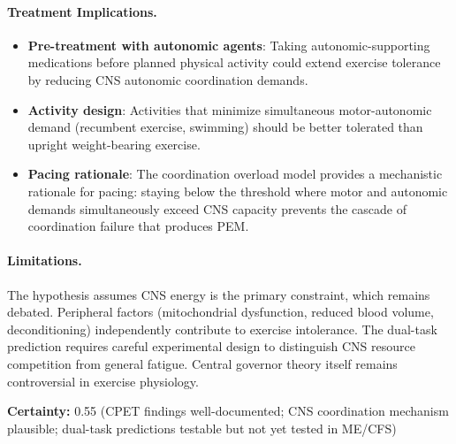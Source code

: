 \begin{hypothesis}
\paragraph{Treatment Implications.}
\begin{itemize}
    \item \textbf{Pre-treatment with autonomic agents}: Taking autonomic-supporting medications before planned physical activity could extend exercise tolerance by reducing CNS autonomic coordination demands.
    \item \textbf{Activity design}: Activities that minimize simultaneous motor-autonomic demand (recumbent exercise, swimming) should be better tolerated than upright weight-bearing exercise.
    \item \textbf{Pacing rationale}: The coordination overload model provides a mechanistic rationale for pacing: staying below the threshold where motor and autonomic demands simultaneously exceed CNS capacity prevents the cascade of coordination failure that produces PEM.
\end{itemize}

\paragraph{Limitations.}
The hypothesis assumes CNS energy is the primary constraint, which remains debated. Peripheral factors (mitochondrial dysfunction, reduced blood volume, deconditioning) independently contribute to exercise intolerance. The dual-task prediction requires careful experimental design to distinguish CNS resource competition from general fatigue. Central governor theory itself remains controversial in exercise physiology.

\textbf{Certainty:} 0.55 (CPET findings well-documented; CNS coordination mechanism plausible; dual-task predictions testable but not yet tested in ME/CFS)
\end{hypothesis}

